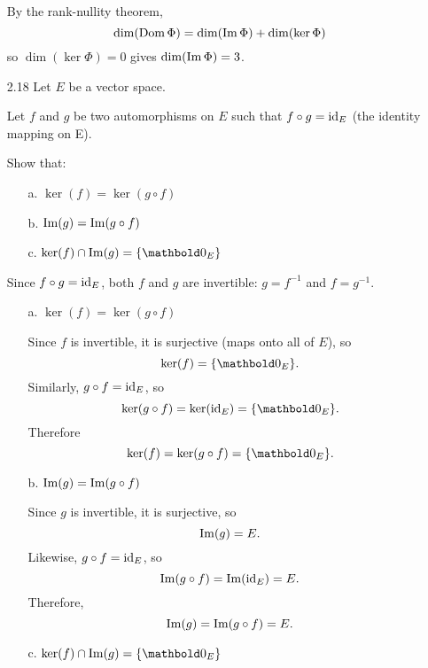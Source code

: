 \documentclass[11pt]{article}
\begin{document}
\begin{enumerate}
          By the rank-nullity theorem,
          \[
              \dim(\operatorname{Dom} \Phi) = \dim(\operatorname{Im} \Phi) + \dim(\ker \Phi)
          \]
          so $\dim(\ker \Phi) = 0$ gives $\dim(\operatorname{Im} \Phi) = 3$.

          \pagebreak

    \item[2.18] Let $E$ be a vector space.

          Let $f$ and $g$ be two automorphisms on $E$ such that $f \circ g = \operatorname{id}_E$ (the identity mapping on E).

          Show that:
          \begin{enumerate}
              \item[a.] $\ker(f) = \ker(g \circ f)$
              \item[b.] $\operatorname{Im}(g) = \operatorname{Im}(g \circ f)$
              \item[c.] $\ker(f) \cap \Img(g) = \{ \vect{0}_E \}$
          \end{enumerate}

          Since $f \circ g = \operatorname{id}_E$, both $f$ and $g$ are invertible: $g = f^{-1}$ and $f = g^{-1}$.

          \begin{enumerate}
              \item[a.] $\ker(f) = \ker(g \circ f)$

                    Since $f$ is invertible, it is surjective (maps onto all of $E$), so
                    \[
                        \ker(f) = \{ \vect{0}_E \}.
                    \]
                    Similarly, $g \circ f = \operatorname{id}_E$, so
                    \[
                        \ker(g \circ f) = \ker(\id_E) = \{ \vect{0}_E \}.
                    \]
                    Therefore
                    \[
                        \ker(f) = \ker(g \circ f) = \{ \vect{0}_E \}.
                    \]

              \item[b.] $\operatorname{Im}(g) = \operatorname{Im}(g \circ f)$

                    Since $g$ is invertible, it is surjective, so
                    \[
                        \operatorname{Im}(g) = E.
                    \]
                    Likewise, $g \circ f = \operatorname{id}_E$, so
                    \[
                        \operatorname{Im}(g \circ f) = \operatorname{Im}(\operatorname{id}_E) = E.
                    \]
                    Therefore,
                    \[
                        \operatorname{Im}(g) = \operatorname{Im}(g \circ f) = E.
                    \]

              \item[c.] $\ker(f) \cap \Img(g) = \{ \vect{0}_E \}$


\end{enumerate}
\end{enumerate}
\end{document}
